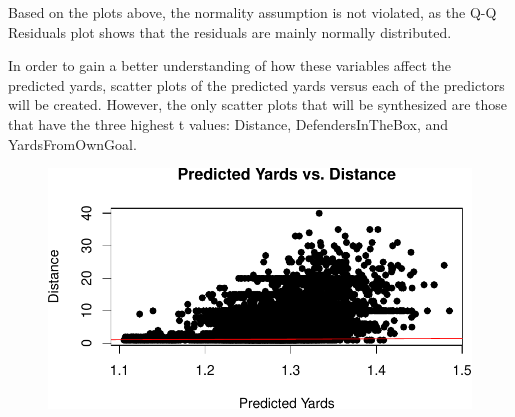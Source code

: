 \documentclass[
  super,
  preprint,
  3p]{elsarticle}
\newenvironment{Shaded}{\begin{snugshade}}{\end{snugshade}}
\newcommand{\AttributeTok}[1]{\textcolor[rgb]{0.40,0.45,0.13}{#1}}
\newcommand{\CommentTok}[1]{\textcolor[rgb]{0.37,0.37,0.37}{#1}}
\newcommand{\DecValTok}[1]{\textcolor[rgb]{0.68,0.00,0.00}{#1}}
\newcommand{\FunctionTok}[1]{\textcolor[rgb]{0.28,0.35,0.67}{#1}}
\newcommand{\NormalTok}[1]{\textcolor[rgb]{0.00,0.23,0.31}{#1}}
\newcommand{\OtherTok}[1]{\textcolor[rgb]{0.00,0.23,0.31}{#1}}
\newcommand{\SpecialCharTok}[1]{\textcolor[rgb]{0.37,0.37,0.37}{#1}}
\newcommand{\StringTok}[1]{\textcolor[rgb]{0.13,0.47,0.30}{#1}}
\begin{document}
Based on the plots above, the normality assumption is not violated, as
the Q-Q Residuals plot shows that the residuals are mainly normally
distributed.

In order to gain a better understanding of how these variables affect
the predicted yards, scatter plots of the predicted yards versus each of
the predictors will be created. However, the only scatter plots that
will be synthesized are those that have the three highest t values:
Distance, DefendersInTheBox, and YardsFromOwnGoal.

\begin{Shaded}
\end{Shaded}

\begin{Shaded}
\end{Shaded}

\begin{figure}[H]

{\centering \includegraphics{project_report_files/figure-pdf/unnamed-chunk-22-1.pdf}

}

\end{figure}
\end{document}
